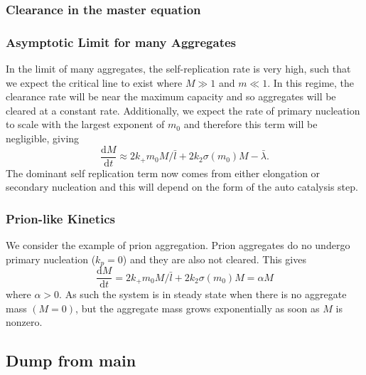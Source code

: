 \subsubsection{Clearance in the master equation}



\subsubsection{Asymptotic Limit for many Aggregates}

In the limit of many aggregates, the self-replication rate is very high, such that we expect the critical line to exist where $M \gg 1$ and $m \ll 1$. In this regime, the clearance rate will be near the maximum capacity and so aggregates will be cleared at a constant rate. Additionally, we expect the rate of primary nucleation to scale with the largest exponent of $m_0$ and therefore this term will be negligible, giving
\begin{equation}
    \frac{\text{d}M}{\text{d}t} \approx 2 k_+m_0 M/\bar{l}+2k_2\sigma(m_0)M-\bar{\lambda}.
\end{equation}
The dominant self replication term now comes from either elongation or secondary nucleation and this will depend on the form of the auto catalysis step.

\subsubsection{Prion-like Kinetics}

We consider the example of prion aggregation. Prion aggregates do no undergo primary nucleation ($k_p = 0$) and they are also not cleared. This gives
\begin{equation}
    \frac{\text{d}M}{\text{d}t} = 2 k_+m_0 M/\bar{l}+2k_2\sigma(m_0)M = \alpha M
\label{eq:M_evolution}
\end{equation}
where $\alpha>0$. As such the system is in steady state when there is no aggregate mass $(M=0)$, but the aggregate mass grows exponentially as soon as $M$ is nonzero.

\subsection{Dump from main}

